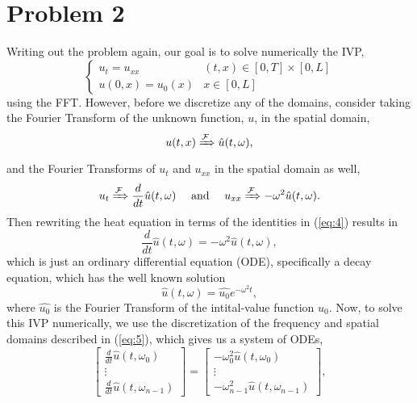 \documentclass[11pt]{article}
\begin{document}
\section{Problem 2}
Writing out the problem again, our goal is to solve numerically the IVP,
			\[
		\begin{cases}
			u_t = u_{xx} & (t,x) \in [0,T] \times [0,L] \\
			u(0,x) = u_0(x) & x \in [0,L]
		\end{cases}
			\]
using the FFT. However, before we discretize any of the domains,
consider taking the Fourier Transform of the unknown function, $u$, in the spatial domain,
\begin{equation*}
	u(t,x) \xRightarrow[]{\mathcal{F}} \hat{u}(t,\omega),
\end{equation*}
and the Fourier Transforms of $u_t$ and $u_{xx}$ in the spatial domain as well,
\begin{equation}
	u_t \xRightarrow[]{\mathcal{F}} \frac{d}{dt}\hat{u}(t,\omega) \quad \text{ and } \quad u_{xx} \xRightarrow[]{\mathcal{F}} -\omega^2\hat{u}(t,\omega).
	\label{eq:4}
\end{equation}
Then rewriting the heat equation in terms of the identities in (\ref{eq:4}) results in
\begin{equation*}
	\frac{d}{dt}\hat{u}(t,\omega) = -\omega^2\hat{u}(t,\omega),
\end{equation*}
which is just an ordinary differential equation (ODE), specifically a decay equation,
which has the well known solution
\begin{equation*}
	\hat{u}(t,\omega) = \hat{u_0}e^{-\omega^2t},
\end{equation*}
where $\hat{u_0}$ is the Fourier Transform of the intital-value function $u_0$.
Now, to solve this IVP numerically, we use the discretization of the frequency and spatial domains
described in (\ref{eq:5}), which gives us a system of ODEs,
\begin{equation*}
	\begin{bmatrix}
		\frac{d}{dt}\hat{u}(t,\omega_0) \\
		\vdots \\
		\frac{d}{dt}\hat{u}(t,\omega_{n-1})
	\end{bmatrix}
	=
	\begin{bmatrix}
		-\omega_0^2\hat{u}(t,\omega_0) \\
		\vdots \\
		-\omega_{n-1}^2\hat{u}(t,\omega_{n-1})
	\end{bmatrix},
\end{equation*}
\end{document}
